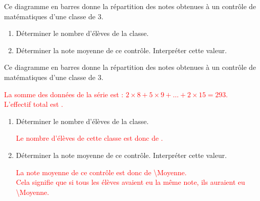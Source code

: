 \begin{exercice*}
    Ce diagramme en barres donne la répartition des notes obtenues à un contrôle de matématiques d'une classe de 3.
    \par\smallskip
    \begin{enumerate}
        \item Déterminer le nombre d'élèves de la classe.
        \item Déterminer la note moyenne de ce contrôle. Interpréter cette valeur.        
    \end{enumerate}
\end{exercice*}
\begin{corrige}
    Ce diagramme en barres donne la répartition des notes obtenues à un contrôle de matématiques d'une classe de 3.
    \par\smallskip
    \hspace*{-10mm}
    \textcolor{red}{%
    La somme des données de la série est : $2\times 8 + 5\times 9 + \dots + 2\times 15=\num{293}$.\\
    L'effectif total est \EffectifTotal.\\
    }
    \begin{enumerate}
        \item Déterminer le nombre d'élèves de la classe.
        \par\smallskip\textcolor{red}{Le nombre d'élèves de cette classe est donc de \EffectifTotal.}
        \item Déterminer la note moyenne de ce contrôle. Interpréter cette valeur.
        \par\smallskip\textcolor{red}{%
        La note moyenne de ce contrôle est donc de \num{\Moyenne}.\\        
        Cela signifie que si tous les élèves avaient eu la même note, ils auraient eu \num{\Moyenne}.
        }
    \end{enumerate}
\end{corrige}

